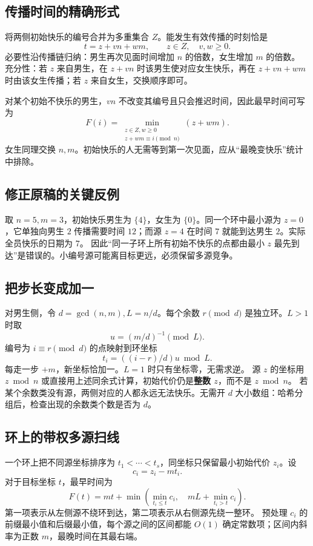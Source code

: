\documentclass[UTF8,a4paper,11pt,twoside,openright,fontset=fandol]{ctexbook}
\theoremstyle{definition}
\begin{document}
\subsection{传播时间的精确形式}
将两侧初始快乐的编号合并为多重集合 $Z$。能发生有效传播的时刻恰是
\[
 t=z+vn+wm,\qquad z\in Z,\quad v,w\ge0.
\]
必要性沿传播链归纳：男生再次见面时间增加 $n$ 的倍数，女生增加 $m$ 的倍数。
充分性：若 $z$ 来自男生，在 $z+vn$ 时该男生使对应女生快乐，再在 $z+vn+wm$ 时由该女生传播；若 $z$ 来自女生，交换顺序即可。

对某个初始不快乐的男生，$vn$ 不改变其编号且只会推迟时间，因此最早时间可写为
\[
 F(i)=\min_{\substack{z\in Z,w\ge0\\z+wm\equiv i\pmod n}}(z+wm).
\]
女生同理交换 $n,m$。初始快乐的人无需等到第一次见面，应从“最晚变快乐”统计中排除。

\subsection{修正原稿的关键反例}
取 $n=5,m=3$，初始快乐男生为 $\{4\}$，女生为 $\{0\}$。同一个环中最小源为 $z=0$，它单独向男生 $2$ 传播需要时间 $12$；而源 $z=4$ 在时间 $7$ 就能到达男生 $2$。实际全员快乐的日期为 $7$。
因此“同一子环上所有初始不快乐的点都由最小 $z$ 最先到达”是错误的。小编号源可能离目标更远，必须保留多源竞争。

\subsection{把步长变成加一}
对男生侧，令 $d=\gcd(n,m),L=n/d$。每个余数 $r\pmod d$ 是独立环。$L>1$ 时取
\[
 u=(m/d)^{-1}\pmod L.
\]
编号为 $i\equiv r\pmod d$ 的点映射到环坐标
\[
 t_i=((i-r)/d)u\bmod L.
\]
每走一步 $+m$，新坐标恰加一。$L=1$ 时只有坐标零，无需求逆。
源 $z$ 的坐标用 $z\bmod n$ 或直接用上述同余式计算，初始代价仍是\textbf{整数 $z$}，而不是 $z\bmod n$。
若某个余数类没有源，两侧对应的人都永远无法快乐。无需开 $d$ 大小数组：哈希分组后，检查出现的余数类个数是否为 $d$。

\subsection{环上的带权多源扫线}
一个环上把不同源坐标排序为 $t_1<\cdots<t_s$，同坐标只保留最小初始代价 $z_i$。设
\[
 c_i=z_i-mt_i.
\]
对于目标坐标 $t$，最早时间为
\[
 F(t)=mt+\min\left(
 \min_{t_i\le t}c_i,\quad
 mL+\min_{t_i>t}c_i\right).
\]
第一项表示从左侧源不绕环到达，第二项表示从右侧源先绕一整环。
预处理 $c_i$ 的前缀最小值和后缀最小值，每个源之间的区间都能 $O(1)$ 确定常数项；区间内斜率为正数 $m$，最晚时间在其最右端。
\end{document}
